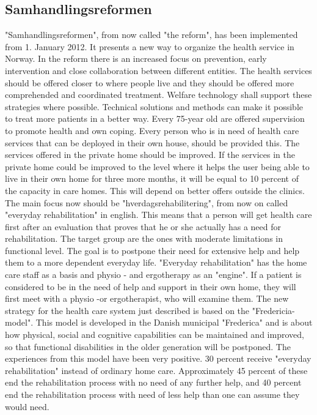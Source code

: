 \subsection{Samhandlingsreformen}
"Samhandlingsreformen", from now called "the reform", has been implemented from 1. January 2012. It presents a new way to organize the health service in Norway. In the reform there is an increased focus on prevention, early intervention and close collaboration between different entities. The health services should be offered closer to where people live and they should be offered more comprehended and coordinated treatment. Welfare technology shall support these strategies where possible. Technical solutions and methods can make it possible to treat more patients in a better way. Every 75-year old are offered supervision to promote health and own coping. Every person who is in need of health care services that can be deployed in their own house, should be provided this. The services offered in the private home should be improved. If the services in the private home could be improved to the level where it helps the user being able to live in their own home for three more months, it will be equal to 10 percent of the capacity in care homes. This will depend on better offers outside the clinics. The main focus now should be "hverdagsrehabilitering", from now on called  "everyday rehabilitation" in english. This means that a person will get health care first after an evaluation that proves that he or she actually has a need for rehabilitation. The target group are the ones with moderate limitations in functional level. The goal is to postpone their need for extensive help and help them to a more dependent everyday life.  "Everyday rehabilitation" has the home care staff as a basis and physio - and ergotherapy as an "engine". If a patient is considered to be in the need of help and support in their own home, they will first meet with a physio -or ergotherapist, who will examine them. The new strategy for the health care system just described is based on the "Fredericia-model". This model is developed in the Danish municipal "Frederica" and is about how physical, social and cognitive capabilities can be maintained and improved, so that functional disabilities in the older generation will be postponed. The experiences from this model have been very positive. 30 percent receive "everyday rehabilitation" instead of ordinary home care. Approximately 45 percent of these end the rehabilitation process with no need of any further help, and 40 percent end the rehabilitation process with need of less help than one can assume they would need.\cite{budsjett}\cite{regjering}
